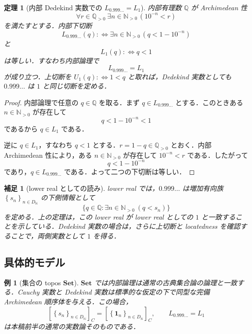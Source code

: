 \documentclass[a4paper,11pt]{ltjsarticle}
\theoremstyle{jpdef}
\newtheorem{remark}[definition]{補足}
\newtheorem{example}[definition]{例}
\theoremstyle{jpthm}
\newtheorem{theorem}[definition]{定理}
\newcommand{\N}{\mathbb{N}}
\newcommand{\DN}{D_{\N}}
\newcommand{\seq}[2]{\left\{#1\right\}_{#2}}
\begin{document}
\begin{theorem}[内部 Dedekind 実数での \(L_{0.999\ldots}=L_1\)]
内部有理数 \(\mathbb Q\) が Archimedean 性
\[
  \forall r\in\mathbb Q_{>0}\ \exists n\in\mathbb N_{>0}\,(10^{-n}<r)
\]
を満たすとする．内部下切断
\[
  L_{0.999\ldots}(q)
  :\Longleftrightarrow
  \exists n\in\mathbb N_{>0}\,(q<1-10^{-n})
\]
と
\[
  L_1(q):\Longleftrightarrow q<1
\]
は等しい．すなわち内部論理で
\[
  L_{0.999\ldots}=L_1
\]
が成り立つ．上切断を \(U_1(q):\Longleftrightarrow 1<q\) と取れば，Dedekind 実数としても \(0.999\ldots\) は \(1\) と同じ切断を定める．
\end{theorem}

\begin{proof}
内部論理で任意の \(q\in\mathbb Q\) を取る．まず \(q\in L_{0.999\ldots}\) とする．このときある \(n\in\mathbb N_{>0}\) が存在して
\[
  q<1-10^{-n}<1
\]
であるから \(q\in L_1\) である．

逆に \(q\in L_1\)，すなわち \(q<1\) とする．\(r=1-q\in\mathbb Q_{>0}\) とおく．内部 Archimedean 性により，ある \(n\in\mathbb N_{>0}\) が存在して \(10^{-n}<r\) である．したがって
\[
  q<1-10^{-n}
\]
であり，\(q\in L_{0.999\ldots}\) である．よって二つの下切断は等しい．
\end{proof}

\begin{remark}[lower real としての読み]
lower real では，\(0.999\ldots\) は増加有向族 \(\seq{s_n}{n\in\DN}\) の下側情報として
\[
  \{q\in\mathbb Q:\exists n\in\mathbb N_{>0}\ (q<s_n)\}
\]
を定める．上の定理は，この lower real が lower real としての \(1\) と一致することを示している．Dedekind 実数の場合は，さらに上切断と locatedness を確認することで，両側実数として \(1\) を得る．
\end{remark}

\subsection{具体的モデル}

\begin{example}[集合の topos \(\mathbf{Set}\)]
\(\mathbf{Set}\) では内部論理は通常の古典集合論の論理と一致する．Cauchy 実数と Dedekind 実数は標準的な仮定の下で同型な完備 Archimedean 順序体を与える．この場合，
\[
  [\seq{s_n}{n\in\DN}]_C=[\seq{\mathbf1_n}{n\in\DN}]_C,
  \qquad L_{0.999\ldots}=L_1
\]
は本稿前半の通常の実数論そのものである．
\end{example}
\end{document}
